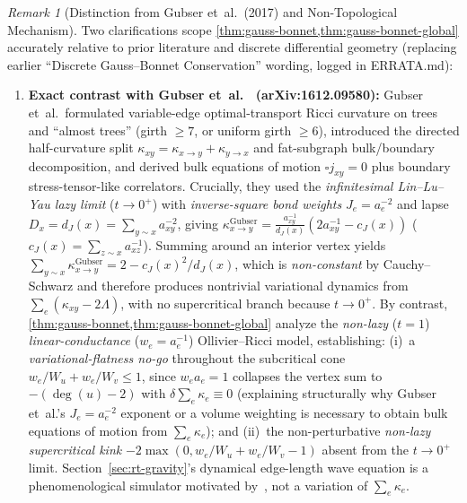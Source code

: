\documentclass[11pt,a4paper]{article}
\numberwithin{equation}{section}
\theoremstyle{plain}
\theoremstyle{definition}
\theoremstyle{remark}
\newtheorem{remark}[theorem]{Remark}
\newcommand{\code}[1]{{\ttfamily\footnotesize\def\_{\textunderscore\penalty0\hskip0pt}#1}}
\begin{document}
\begin{remark}[Distinction from Gubser et~al.\ (2017) and Non-Topological Mechanism]
\label{rem:gubser-non-topological}
Two clarifications scope \cref{thm:gauss-bonnet,thm:gauss-bonnet-global} accurately relative to prior literature and discrete differential geometry (replacing earlier ``Discrete Gauss--Bonnet Conservation'' wording, logged in \code{ERRATA.md}):
\begin{enumerate}[leftmargin=1.8em,itemsep=2pt]
  \item \textbf{Exact contrast with Gubser et~al.~\cite{GubserEdge2017} (\code{arXiv:1612.09580}):} Gubser et~al.\ formulated variable-edge optimal-transport Ricci curvature on trees and ``almost trees'' (girth $\ge 7$, or uniform girth $\ge 6$), introduced the directed half-curvature split $\kappa_{xy} = \kappa_{x \to y} + \kappa_{y \to x}$ and fat-subgraph bulk/boundary decomposition, and derived bulk equations of motion $\square j_{xy} = 0$ plus boundary stress-tensor-like correlators. Crucially, they used the \emph{infinitesimal Lin--Lu--Yau lazy limit} ($t \to 0^+$) with \emph{inverse-square bond weights} $J_e = a_e^{-2}$ and lapse $D_x = d_J(x) = \sum_{y \sim x} a_{xy}^{-2}$, giving $\kappa_{x\to y}^{\mathrm{Gubser}} = \frac{a_{xy}^{-1}}{d_J(x)}(2a_{xy}^{-1} - c_J(x))$ ($c_J(x) = \sum_{z\sim x} a_{xz}^{-1}$). Summing around an interior vertex yields $\sum_{y\sim x} \kappa_{x\to y}^{\mathrm{Gubser}} = 2 - c_J(x)^2/d_J(x)$, which is \emph{non-constant} by Cauchy--Schwarz and therefore produces nontrivial variational dynamics from $\sum_e (\kappa_{xy} - 2\Lambda)$, with no supercritical branch because $t \to 0^+$. By contrast, \cref{thm:gauss-bonnet,thm:gauss-bonnet-global} analyze the \emph{non-lazy} ($t = 1$) \emph{linear-conductance} ($w_e = a_e^{-1}$) Ollivier--Ricci model, establishing: (i)~a \emph{variational-flatness no-go} throughout the subcritical cone $w_e/W_u + w_e/W_v \le 1$, since $w_e a_e = 1$ collapses the vertex sum to $-(\deg(u)-2)$ with $\delta\sum_e \kappa_e \equiv 0$ (explaining structurally why Gubser et~al.'s $J_e = a_e^{-2}$ exponent or a volume weighting is necessary to obtain bulk equations of motion from $\sum_e \kappa_e$); and (ii)~the non-perturbative \emph{non-lazy supercritical kink} $-2\max(0, w_e/W_u + w_e/W_v - 1)$ absent from the $t \to 0^+$ limit. Section~\ref{sec:rt-gravity}'s dynamical edge-length wave equation is a phenomenological simulator motivated by~\cite{GubserEdge2017}, not a variation of $\sum_e \kappa_e$.

\end{enumerate}
\end{remark}
\end{document}
